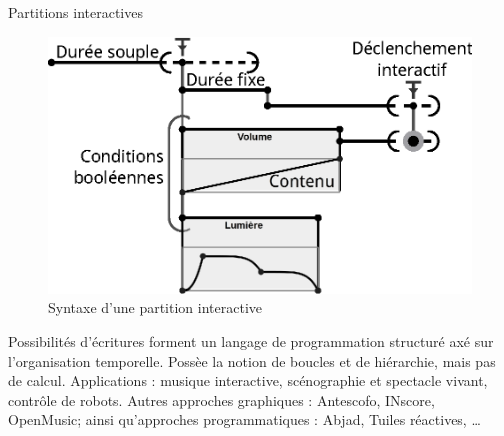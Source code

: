 \begin{block}{Partitions interactives}
\begin{figure}
\includegraphics[width=\columnwidth]{images/score.eps}
\caption{Syntaxe d'une partition interactive}
\end{figure}
Possibilités d'écritures forment un langage de programmation structuré axé sur l'organisation temporelle. Possèe la notion de boucles et de hiérarchie, 
mais pas de calcul.
Applications : musique interactive, scénographie et spectacle vivant, contrôle de robots.
Autres approches graphiques : Antescofo, INscore, OpenMusic; ainsi qu'approches programmatiques : Abjad, Tuiles réactives, \dots
\end{block}